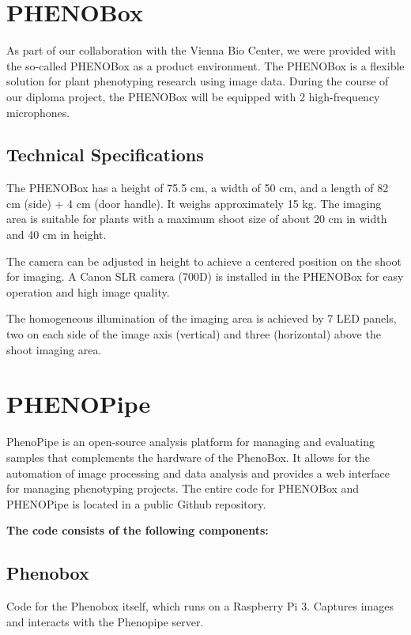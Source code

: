 \section{PHENOBox}
As part of our collaboration with the Vienna Bio Center, we were provided with the so-called PHENOBox as a product environment. The PHENOBox is a flexible solution for plant phenotyping research using image data. During the course of our diploma project, the PHENOBox will be equipped with 2 high-frequency microphones. \cite{czedik-eysenberg_phenobox_2018}

\subsection{Technical Specifications}
The PHENOBox has a height of 75.5 cm, a width of 50 cm, and a length of 82 cm (side) + 4 cm (door handle). It weighs approximately 15 kg. The imaging area is suitable for plants with a maximum shoot size of about 20 cm in width and 40 cm in height. \cite{czedik-eysenberg_phenobox_2018}

The camera can be adjusted in height to achieve a centered position on the shoot for imaging. A Canon SLR camera (700D) is installed in the PHENOBox for easy operation and high image quality. \cite{czedik-eysenberg_phenobox_2018}

The homogeneous illumination of the imaging area is achieved by 7 LED panels, two on each side of the image axis (vertical) and three (horizontal) above the shoot imaging area. \cite{czedik-eysenberg_phenobox_2018}

\section{PHENOPipe}
PhenoPipe is an open-source analysis platform for managing and evaluating samples that complements the hardware of the PhenoBox. It allows for the automation of image processing and data analysis and provides a web interface for managing phenotyping projects. The entire code for PHENOBox and PHENOPipe is located in a public Github repository. \cite{czedik-eysenberg_phenobox_2018}

\textbf{The code consists of the following components:}

\subsection{Phenobox}
Code for the Phenobox itself, which runs on a Raspberry Pi 3.\newline
Captures images and interacts with the Phenopipe server.

